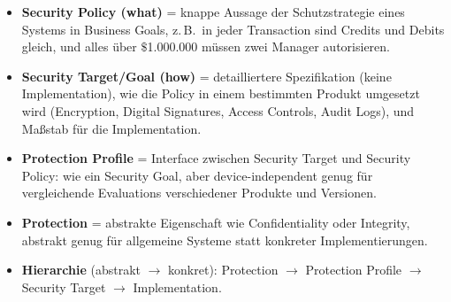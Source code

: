 \documentclass[10pt,a4paper]{article}
\begin{document}
\begin{itemize}
\item \textbf{Security Policy (what)} = knappe Aussage der Schutzstrategie eines Systems in Business Goals, z.\,B.\ \glqq in jeder Transaction sind Credits und Debits gleich, und alles über $\$$1.000.000 müssen zwei Manager autorisieren\grqq.
\item \textbf{Security Target/Goal (how)} = detailliertere Spezifikation (keine Implementation), wie die Policy in einem bestimmten Produkt umgesetzt wird (Encryption, Digital Signatures, Access Controls, Audit Logs), und Maßstab für die Implementation.
\item \textbf{Protection Profile} = Interface zwischen Security Target und Security Policy: wie ein Security Goal, aber device-independent genug für vergleichende Evaluations verschiedener Produkte und Versionen.
\item \textbf{Protection} = abstrakte Eigenschaft wie Confidentiality oder Integrity, abstrakt genug für allgemeine Systeme statt konkreter Implementierungen.
\item \textbf{Hierarchie} (abstrakt $\rightarrow$ konkret): Protection $\rightarrow$ Protection Profile $\rightarrow$ Security Target $\rightarrow$ Implementation.
\end{itemize}
\end{document}
